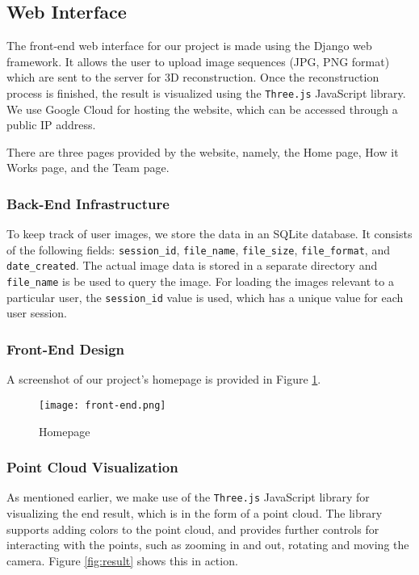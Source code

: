 \documentclass[11pt, a4paper, openany]{article}
\begin{document}
\subsection{Web Interface}
The front-end web interface for our project is made using the Django web framework. It allows the user to upload image sequences (JPG, PNG format) which are sent to the server for 3D reconstruction. Once the reconstruction process is finished, the result is visualized using the \verb|Three.js| JavaScript library. We use Google Cloud for hosting the website, which can be accessed through a public IP address.

There are three pages provided by the website, namely, the Home page, How it Works page, and the Team page.

\subsubsection{Back-End Infrastructure}
To keep track of user images, we store the data in an SQLite database. It consists of the following fields: \verb|session_id|, \verb|file_name|, \verb|file_size|, \verb|file_format|, and \verb|date_created|. The actual image data is stored in a separate directory and \verb|file_name| is be used to query the image. For loading the images relevant to a particular user, the \verb|session_id| value is used, which has a unique value for each user session.

\subsubsection{Front-End Design}
A screenshot of our project's homepage is provided in Figure \ref{fig:homepage}.

\begin{figure}[H]
  \texttt{[image: front-end.png]}
  \caption{Homepage}
  \label{fig:homepage}
\end{figure}

\subsubsection{Point Cloud Visualization}
As mentioned earlier, we make use of the \verb|Three.js| JavaScript library for visualizing the end result, which is in the form of a point cloud. The library supports adding colors to the point cloud, and provides further controls for interacting with the points, such as zooming in and out, rotating and moving the camera. Figure \ref{fig:result} shows this in action.
\end{document}
